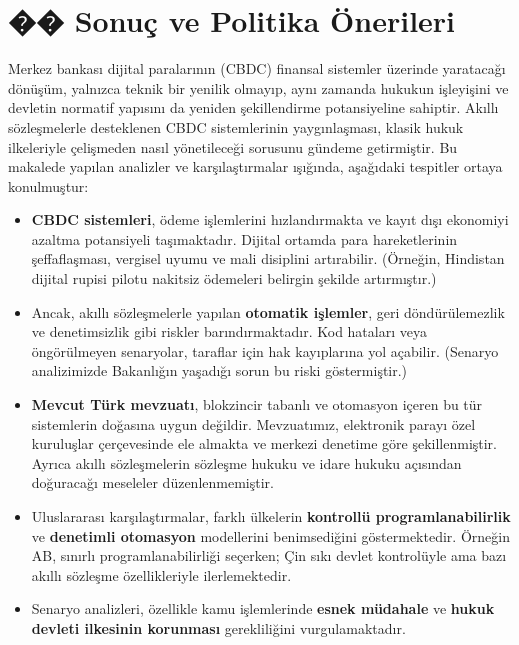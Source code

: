 \documentclass[a4paper,12pt]{article}
\begin{document}
\section{�� Sonuç ve Politika Önerileri}

Merkez bankası dijital paralarının (CBDC) finansal sistemler üzerinde yaratacağı dönüşüm, yalnızca teknik bir yenilik olmayıp, aynı zamanda hukukun işleyişini ve devletin normatif yapısını da yeniden şekillendirme potansiyeline sahiptir. Akıllı sözleşmelerle desteklenen CBDC sistemlerinin yaygınlaşması, klasik hukuk ilkeleriyle çelişmeden nasıl yönetileceği sorusunu gündeme getirmiştir. Bu makalede yapılan analizler ve karşılaştırmalar ışığında, aşağıdaki tespitler ortaya konulmuştur:

\begin{itemize}
  \item \textbf{CBDC sistemleri}, ödeme işlemlerini hızlandırmakta ve kayıt dışı ekonomiyi azaltma potansiyeli taşımaktadır. Dijital ortamda para hareketlerinin şeffaflaşması, vergisel uyumu ve mali disiplini artırabilir. (Örneğin, Hindistan dijital rupisi pilotu nakitsiz ödemeleri belirgin şekilde artırmıştır.)
  \item Ancak, akıllı sözleşmelerle yapılan \textbf{otomatik işlemler}, geri döndürülemezlik ve denetimsizlik gibi riskler barındırmaktadır. Kod hataları veya öngörülmeyen senaryolar, taraflar için hak kayıplarına yol açabilir. (Senaryo analizimizde Bakanlığın yaşadığı sorun bu riski göstermiştir.)
  \item \textbf{Mevcut Türk mevzuatı}, blokzincir tabanlı ve otomasyon içeren bu tür sistemlerin doğasına uygun değildir. Mevzuatımız, elektronik parayı özel kuruluşlar çerçevesinde ele almakta ve merkezi denetime göre şekillenmiştir. Ayrıca akıllı sözleşmelerin sözleşme hukuku ve idare hukuku açısından doğuracağı meseleler düzenlenmemiştir.
  \item Uluslararası karşılaştırmalar, farklı ülkelerin \textbf{kontrollü programlanabilirlik} ve \textbf{denetimli otomasyon} modellerini benimsediğini göstermektedir. Örneğin AB, sınırlı programlanabilirliği seçerken; Çin sıkı devlet kontrolüyle ama bazı akıllı sözleşme özellikleriyle ilerlemektedir.
  \item Senaryo analizleri, özellikle kamu işlemlerinde \textbf{esnek müdahale} ve \textbf{hukuk devleti ilkesinin korunması} gerekliliğini vurgulamaktadır.
\end{itemize}
\end{document}
